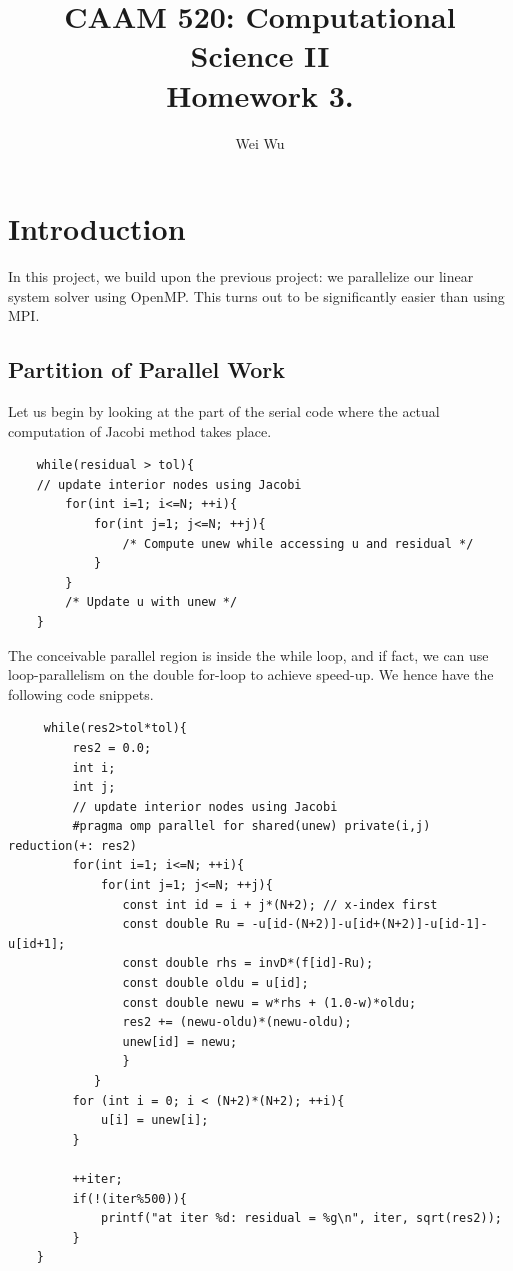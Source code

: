\documentclass{amsart} %
\title{CAAM 520: Computational Science II \\
Homework 3.}
\author{Wei Wu}
\begin{document}

\maketitle

\section{Introduction} 

In this project, we build upon the previous project: we parallelize our linear system solver using OpenMP. This turns out to be significantly easier than using MPI. 

\subsection{Partition of Parallel Work}

Let us begin by looking at the part of the serial code where the actual computation of Jacobi method takes place. 

\begin{lstlisting}
	while(residual > tol){
	// update interior nodes using Jacobi
		for(int i=1; i<=N; ++i){
			for(int j=1; j<=N; ++j){
				/* Compute unew while accessing u and residual */
			}
		}
		/* Update u with unew */
	}
\end{lstlisting}   

The conceivable parallel region is inside the while loop, and if fact, we can use loop-parallelism on the double for-loop to achieve speed-up. We hence have the following code snippets. 
  
\begin{lstlisting}
	 while(res2>tol*tol){
		 res2 = 0.0;
		 int i;
		 int j;
		 // update interior nodes using Jacobi
		 #pragma omp parallel for shared(unew) private(i,j) reduction(+: res2)
		 for(int i=1; i<=N; ++i){
			 for(int j=1; j<=N; ++j){
				const int id = i + j*(N+2); // x-index first
				const double Ru = -u[id-(N+2)]-u[id+(N+2)]-u[id-1]-u[id+1];
				const double rhs = invD*(f[id]-Ru);
				const double oldu = u[id];
				const double newu = w*rhs + (1.0-w)*oldu;
				res2 += (newu-oldu)*(newu-oldu);
				unew[id] = newu;
				}
			}
		 for (int i = 0; i < (N+2)*(N+2); ++i){
			 u[i] = unew[i];
		 }
	 
		 ++iter;
		 if(!(iter%500)){
			 printf("at iter %d: residual = %g\n", iter, sqrt(res2));
		 }
	}
\end{lstlisting}
\end{document}
